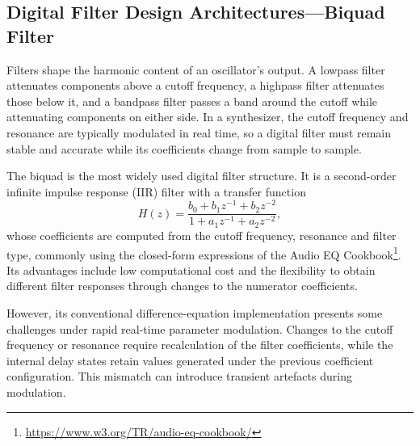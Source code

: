 \subsection{Digital Filter Design Architectures---Biquad Filter}
\noindent
Filters shape the harmonic content of an oscillator's output. A lowpass filter attenuates components 
above a cutoff frequency, a highpass filter
attenuates those below it, and a bandpass filter passes a band around the cutoff while
attenuating components on either side. In a synthesizer, the cutoff frequency and resonance
are typically modulated in real time, so a digital filter must remain stable and accurate
while its coefficients change from sample to sample.

The biquad is the most widely used digital filter structure. It is a second-order infinite
impulse response (IIR) filter with a transfer function
\begin{equation}
  H(z) = \frac{b_0 + b_1 z^{-1} + b_2 z^{-2}}{1 + a_1 z^{-1} + a_2 z^{-2}},
\end{equation}
whose coefficients are computed from the cutoff frequency, resonance and filter type, commonly
using the closed-form expressions of the Audio EQ Cookbook\footnote{\url{https://www.w3.org/TR/audio-eq-cookbook/}\label{fn:audio_eq_cookbook}}. Its advantages include low
computational cost and the flexibility to obtain different filter responses through changes to the 
numerator coefficients.

However, its conventional difference-equation implementation presents
some challenges under rapid real-time parameter modulation. Changes to the cutoff frequency or 
resonance require recalculation of the filter 
coefficients, while the internal delay states retain values generated under the previous coefficient 
configuration. This mismatch can introduce transient artefacts during modulation\cite{biquad}.

